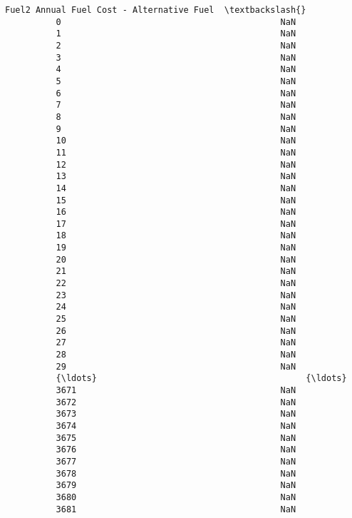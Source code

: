 \documentclass[11pt]{article}
\begin{document}
\begin{Verbatim}[commandchars=\\\{\}]
                Fuel2 Annual Fuel Cost - Alternative Fuel  \textbackslash{}
          0                                           NaN   
          1                                           NaN   
          2                                           NaN   
          3                                           NaN   
          4                                           NaN   
          5                                           NaN   
          6                                           NaN   
          7                                           NaN   
          8                                           NaN   
          9                                           NaN   
          10                                          NaN   
          11                                          NaN   
          12                                          NaN   
          13                                          NaN   
          14                                          NaN   
          15                                          NaN   
          16                                          NaN   
          17                                          NaN   
          18                                          NaN   
          19                                          NaN   
          20                                          NaN   
          21                                          NaN   
          22                                          NaN   
          23                                          NaN   
          24                                          NaN   
          25                                          NaN   
          26                                          NaN   
          27                                          NaN   
          28                                          NaN   
          29                                          NaN   
          {\ldots}                                         {\ldots}   
          3671                                        NaN   
          3672                                        NaN   
          3673                                        NaN   
          3674                                        NaN   
          3675                                        NaN   
          3676                                        NaN   
          3677                                        NaN   
          3678                                        NaN   
          3679                                        NaN   
          3680                                        NaN   
          3681                                        NaN   

\end{Verbatim}
\end{document}
